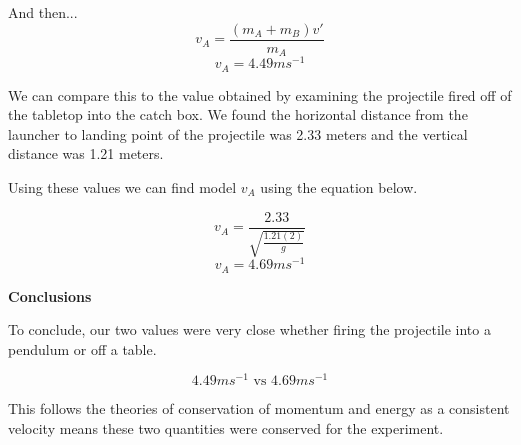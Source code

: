 \documentclass[12pt]{article}
\begin{document}
And then...
\[ v_A = \frac{(m_A + m_B)v\prime}{m_A} \]
\[ v_A = 4.49 ms^{-1} \]

\newpage
We can compare this to the value obtained by examining the projectile fired off of the tabletop into the catch box.
We found the horizontal distance from the launcher to landing point of the projectile was 2.33 meters and the vertical
distance was 1.21 meters.

Using these values we can find model $v_A$ using the equation below. 

\[ v_A = \frac{2.33}{\sqrt{\frac{1.21(2)}{g}}} \]
\[ v_A = 4.69 ms^{-1} \]

\textbf{Conclusions}

To conclude, our two values were very close whether firing the projectile into a pendulum or off a table.

\[ 4.49 ms^{-1} \text{ vs } 4.69 ms^{-1} \]

This follows the theories of conservation of momentum and energy as a consistent velocity means these two quantities were conserved
for the experiment.
\end{document}
